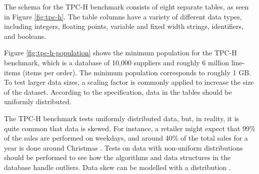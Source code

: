 The schema for the TPC-H benchmark consists of eight separate tables, as seen in Figure \ref{fig:tpc-h}. The table columns have a variety of different data types, including integers, floating points, variable and fixed width strings, identifiers, and booleans. 

Figure \ref{fig:tpc-h-population} shows the minimum population for the TPC-H benchmark, which is a database of 10,000 suppliers and roughly 6 million line-items (items per order). The minimum population corresponds to roughly 1 GB. To test larger data sizes, a scaling factor is commonly applied to increase the size of the dataset. According to the specification, data in the tables should be uniformly distributed.

The TPC-H benchmark tests uniformly distributed data, but, in reality, it is quite common that data is skewed. For instance, a retailer might expect that 99\% of the sales are performed on weekdays, and around 40\% of the total sales for a year is done around Christmas \cite{Raman2008-gi}. Tests on data with non-uniform distributions should be performed to see how the algorithms and data structures in the database handle outliers. Data skew can be modelled with a  distribution \cite{Holloway2008-rr}. 


